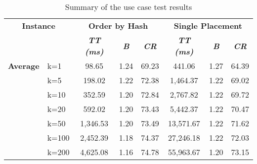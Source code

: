\begin{table}[htbp]
    \caption{Summary of the use case test results}
    \begin{tabular}{ll|ccc|ccc}
    \multicolumn{ 2}{c|}{\textbf{Instance}} & \multicolumn{ 3}{c|}{\textbf{Order by Hash}} & \multicolumn{ 3}{c}{\textbf{Single Placement}} \\ 
    \multicolumn{ 2}{l|}{} & \textbf{\textit{TT (ms)}} & \textbf{\textit{B}} & \textbf{\textit{CR}} & \textbf{\textit{TT (ms)}} & \textbf{\textit{B}} & \textbf{\textit{CR}} \\ \hline
    \multicolumn{1}{r}{\textbf{Average}} & k=1 & 98.65 & 1.24 & 69.23 & 441.06 & 1.27 & 64.39 \\ 
     & k=5 & 198.02 & 1.22 & 72.38 & 1,464.37 & 1.22 & 69.02 \\ 
     & k=10 & 352.59 & 1.20 & 72.84 & 2,767.82 & 1.22 & 69.72 \\ 
     & k=20 & 592.02 & 1.20 & 73.43 & 5,442.37 & 1.22 & 70.47 \\ 
     & k=50 & 1,346.53 & 1.20 & 73.49 & 13,571.67 & 1.22 & 71.62 \\ 
     & k=100 & 2,452.39 & 1.18 & 74.37 & 27,246.18 & 1.22 & 72.03 \\ 
     & k=200 & 4,625.08 & 1.16 & 74.78 & 55,963.67 & 1.20 & 73.15 \\ \hline
    \end{tabular}
    \label{use_case_avg}
    \end{table}
    